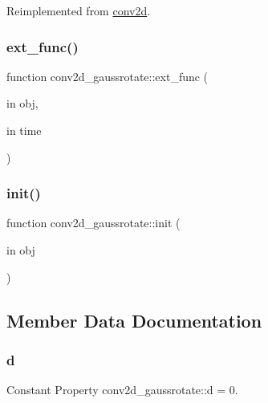 Reimplemented from \hyperlink{classconv2d_a2a9302ee21fb44a98550dcae0fa1d855}{conv2d}.

\mbox{\label{classconv2d__gaussrotate_a3aa479747961e02124ff869de2d8d893}} 
\subsubsection{\texorpdfstring{ext\+\_\+func()}{ext\_func()}}
{\footnotesize\ttfamily function conv2d\+\_\+gaussrotate\+::ext\+\_\+func (\begin{DoxyParamCaption}\item[{in}]{obj,  }\item[{in}]{time }\end{DoxyParamCaption})}

\mbox{\label{classconv2d__gaussrotate_ab32437777016595cca28ed2fd3d20260}} 
\subsubsection{\texorpdfstring{init()}{init()}}
{\footnotesize\ttfamily function conv2d\+\_\+gaussrotate\+::init (\begin{DoxyParamCaption}\item[{in}]{obj }\end{DoxyParamCaption})}



\subsection{Member Data Documentation}
\mbox{\label{classconv2d__gaussrotate_a296f48146d8b8ca8ac05c662445c2092}} 
\subsubsection{\texorpdfstring{d}{d}}
{\footnotesize\ttfamily Constant Property conv2d\+\_\+gaussrotate\+::d = 0.}

